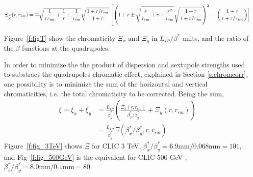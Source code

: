 {\scriptsize
\begin{equation}
 \Xi_{x\atop y}(r,r_{im})=\mp\sqrt{\frac{1}{rr_{im}}+\frac{1}{r}+\frac{1}{r_{im}}}\sqrt{\frac{1+r/r_{im}}{1+r}} \left[\left(1+r\pm\sqrt{\frac{r}{r_{im}}+r+\frac{r^2}{r_{im}}}\sqrt{\frac{1+r}{1+r/r_{im}}}\right)^2\right.-\left.\left(\frac{1+r}{1+r/r_{im}}\right)\right]
\end{equation}}\par
Figure~\ref{f:figT} show the chromaticity $\Xi_x$ and $\Xi_y$ in $L_{IP}/\beta^*$ units, and the ratio of the $\beta$ functions at the quadrupoles.\par
In order to minimize the the product of dispersion and sextupole strengths used to substract the quadrupoles chromatic effect, explained in Section \ref{s:chromcorr}, one possibility is to minimize the sum of the horizontal and vertical chromaticities, i.e. the total chromaticity to be corrected. Being the sum, 
\begin{align}
 \xi = \xi_x + \xi_y &= \frac{L_{IP}}{\beta^*_y}\left(\frac{\Xi_x(r,r_{im})}{\beta^*_x/\beta^*_y}+\Xi_y(r,r_{im})\right)\\
 &= \frac{L_{IP}}{\beta^*_y}\Xi(\beta^*_x/\beta^*_y,r,r_{im})
\end{align}
Figure~\ref{f:fig_3TeV} shows $\Xi$ for CLIC 3 TeV, $\beta^*_x/\beta^*_y=6.9\text{mm}/0.068\text{mm}=101$, and Fig~\ref{f:fig_500GeV} is the equivalent for CLIC 500 GeV \cite{CLICdes}, $\beta^*_x/\beta^*_y=8.0\text{mm}/0.1\text{mm}=80$.\par
